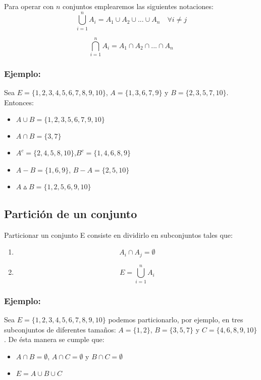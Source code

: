 \documentclass[0_algebra.tex]{subfiles}
\begin{document}
Para operar con $n$ conjuntos emplearemos las siguientes notaciones:
$$
\bigcup_{i=1}^n A_i = A_1 \cup A_2 \cup ... \cup A_n \quad \forall i \not = j
$$

$$
\bigcap_{i=1}^n A_i = A_1 \cap A_2 \cap ... \cap A_n
$$

\subsubsection*{Ejemplo:}
Sea $E=\lbrace 1,2,3,4,5,6,7,8,9,10\rbrace$, $A=\lbrace1,3,6,7,9\rbrace$ y $B=\lbrace2,3,5,7,10\rbrace$. Entonces:
\begin{itemize}
\item $A \cup B =\lbrace 1,2,3,5,6,7,9,10 \rbrace$
\item $A \cap B =\lbrace 3,7 \rbrace$
\item $A^c=\lbrace 2,4,5,8,10 \rbrace$,\quad $B^c= \lbrace 1,4,6,8,9\rbrace$
\item $A-B=\lbrace 1,6,9 \rbrace$, \quad $B-A=\lbrace 2,5,10 \rbrace$
\item $A\vartriangle B= \lbrace 1,2,5,6,9,10 \rbrace$

\end{itemize}

\subsection*{Partición de un conjunto}
Particionar un conjunto E consiste en dividirlo en subconjuntos tales que:
\begin{enumerate}
\item $$A_i \cap A_j =\emptyset$$
\item $$E=\bigcup_{i=1}^n A_i$$
\end{enumerate}

\subsubsection*{Ejemplo:}
Sea $E=\lbrace 1,2,3,4,5,6,7,8,9,10\rbrace$ podemos particionarlo, por ejemplo, en tres subconjuntos de diferentes tamaños: $A=\lbrace 1,2 \rbrace$, $B=\lbrace 3,5,7 \rbrace$ y $C=\lbrace 4,6,8,9,10 \rbrace$. De ésta manera se cumple que:
\begin{itemize}
\item  $A \cap B =\emptyset$, $A \cap C =\emptyset$ y $B \cap C =\emptyset$
\item  $E= A \cup B \cup C$
\end{itemize}
\end{document}
